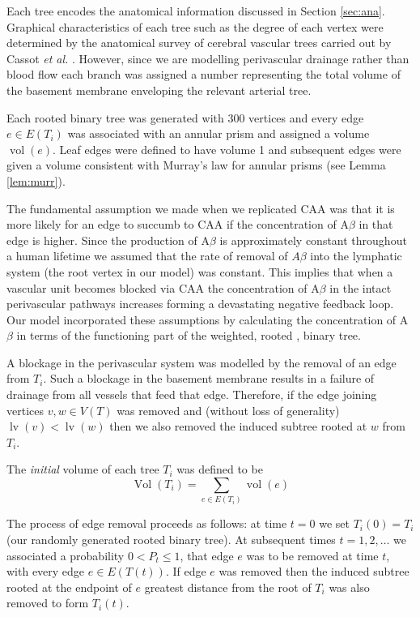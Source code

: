 \documentclass[10pt]{amsart} %
\theoremstyle{definition}
\DeclareMathOperator{\vol}{vol}
\DeclareMathOperator{\Vol}{Vol}
\DeclareMathOperator{\lv}{lv}
\begin{document}
Each tree encodes the anatomical information discussed in Section \ref{sec:ana}. Graphical characteristics of each tree such as the degree of each vertex were determined by the anatomical survey of cerebral vascular trees carried out by Cassot \emph{et al.} \cite{Cassot}.  However, since we are modelling perivascular drainage rather than blood flow each branch was assigned a number representing the total volume of the basement membrane enveloping the relevant arterial tree.   

Each rooted binary tree was generated with $300$ vertices and every edge $e \in E(T_i)$ was associated with an annular prism and assigned a volume $\vol(e)$.   Leaf  edges were defined to have volume 1 and subsequent edges were given a volume consistent with Murray's law for annular prisms (see Lemma \ref{lem:murr}).  

The fundamental assumption we made when we replicated CAA was that it is more likely for an edge to succumb to CAA if the concentration of A$\beta$ in that edge is higher.  Since the production of A$\beta$ is approximately constant throughout a human lifetime \cite{wellerperi} we assumed that the rate of removal of $A\beta$ into the lymphatic system (the root vertex in our model) was constant. This implies that when a vascular unit becomes blocked via CAA the concentration of A$\beta$ in the intact perivascular pathways increases forming a devastating negative feedback loop.  Our model incorporated these assumptions by calculating the concentration of A$\beta$ in terms of the functioning part of the weighted, rooted , binary tree. 

A blockage in the perivascular system was modelled by the removal of an edge from $T_i$.  Such a blockage in the basement membrane results in a failure of drainage from all vessels that feed that edge. Therefore, if the edge joining vertices $v,w \in V(T)$ was removed and (without loss of generality) $\lv(v) < \lv(w)$ then we also removed the induced subtree rooted at $w$ from $T_i$.     
    

The \emph{initial} volume of each tree $T_i$ was defined to be 
\[\Vol(T_i) =  \sum_{e \in E(T_i)} \vol(e)\]
 
The process of edge removal proceeds as follows:  at time $t=0$ we set $T_{i}(0) = T_{i}$ (our randomly generated rooted binary tree).  At subsequent times  $t = 1,2,\dots$ we associated a probability $0<P_{t}\leq 1$, that edge $e$ was to be removed at time $t$, with every edge $e \in E(T(t))$. If edge $e$ was removed then the induced subtree rooted at the endpoint of $e$ greatest distance from the root of $T_i$ was also removed to form $T_i(t)$.   
\end{document}
